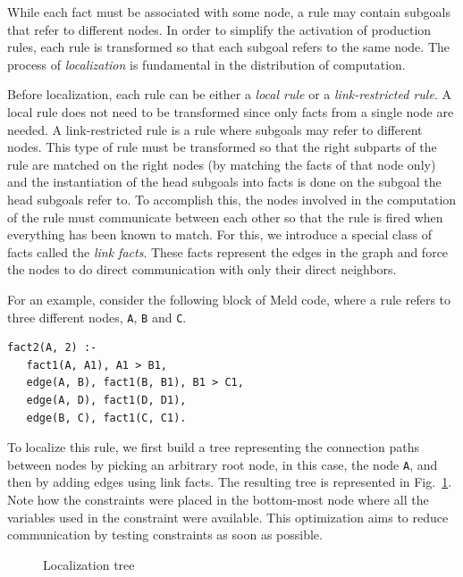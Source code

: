 \documentclass[preprint]{sigplanconf}
\begin{document}
While each fact must be associated with some node, a rule may contain subgoals that refer to
different nodes. In order to simplify the activation of production rules, each rule is transformed so that
each subgoal refers to the same node. The process of \emph{localization} is fundamental
in the distribution of computation.

Before localization, each rule can be either a \emph{local rule} or a \emph{link-restricted rule}.
A local rule does not need to be transformed since only facts from a single node are needed.
A link-restricted rule is a rule where subgoals may refer to different nodes. This type of rule
must be transformed so that the right subparts of the rule are matched
on the right nodes (by matching the facts of that node only)
and the instantiation of the head subgoals into facts is done on the subgoal the head subgoals
refer to. To accomplish this, the nodes involved in the computation of the rule must communicate
between each other so that the rule is fired when everything has been known to match.
For this, we introduce a special class of facts called the \emph{link facts}. These facts
represent the edges in the graph and force the nodes to do direct communication with
only their direct neighbors.

For an example, consider the following block of Meld code, where a rule refers to three different
nodes, \texttt{A}, \texttt{B} and \texttt{C}.

\begin{verbatim}
fact2(A, 2) :-
   fact1(A, A1), A1 > B1,
   edge(A, B), fact1(B, B1), B1 > C1,
   edge(A, D), fact1(D, D1),
   edge(B, C), fact1(C, C1).
\end{verbatim}

To localize this rule, we first build a tree representing the connection paths between nodes by
picking an arbitrary root node, in this case, the node \texttt{A}, and then by adding
edges using link facts. The resulting tree is represented in Fig.~\ref{fig:loctree}.
Note how the constraints were placed in the bottom-most node where all the variables used in the constraint
were available. This optimization aims to reduce communication by testing constraints as soon as
possible.

\qtreecenterfalse
\begin{figure}[ht!]
\caption{Localization tree}
\label{fig:loctree}
\end{figure}
\end{document}
